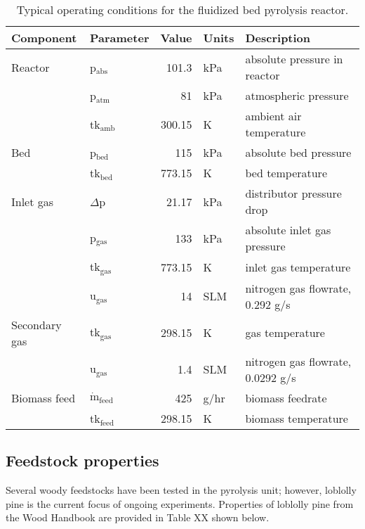 \begin{table}[H]
    \centering
    \caption{Typical operating conditions for the fluidized bed pyrolysis reactor.}
    \label{tab:operating}
    \begin{tabular}{llrll}
        \toprule
        Component & Parameter & Value & Units & Description \\
        \midrule
        Reactor
            & p$_\textrm{abs}$ & 101.3 & kPa & absolute pressure in reactor \\
            & p$_\textrm{atm}$ & 81 & kPa & atmospheric pressure \\
            & tk$_\textrm{amb}$ & 300.15 & K & ambient air temperature \\
        Bed
            & p$_\textrm{bed}$ & 115 & kPa & absolute bed pressure \\
            & tk$_\textrm{bed}$ & 773.15 & K & bed temperature \\
        Inlet gas
            & $\Delta$p & 21.17 & kPa & distributor pressure drop \\
            & p$_\textrm{gas}$ & 133 & kPa & absolute inlet gas pressure \\
            & tk$_\textrm{gas}$ & 773.15 & K & inlet gas temperature \\
            & u$_\textrm{gas}$ & 14 & SLM & nitrogen gas flowrate, 0.292 g/s \\
        Secondary gas
            & tk$_\textrm{gas}$ & 298.15 & K & gas temperature \\
            & u$_\textrm{gas}$ & 1.4 & SLM & nitrogen gas flowrate, 0.0292 g/s \\
        Biomass feed
            & $\dot{\textrm{m}}_\textrm{feed}$ & 425 & g/hr & biomass feedrate \\
            & tk$_\textrm{feed}$ & 298.15 & K & biomass temperature \\
        \bottomrule
    \end{tabular}
\end{table}

\subsection{Feedstock properties}

Several woody feedstocks have been tested in the pyrolysis unit; however, loblolly pine is the current focus of ongoing experiments. Properties of loblolly pine from the Wood Handbook are provided in Table XX shown below.

